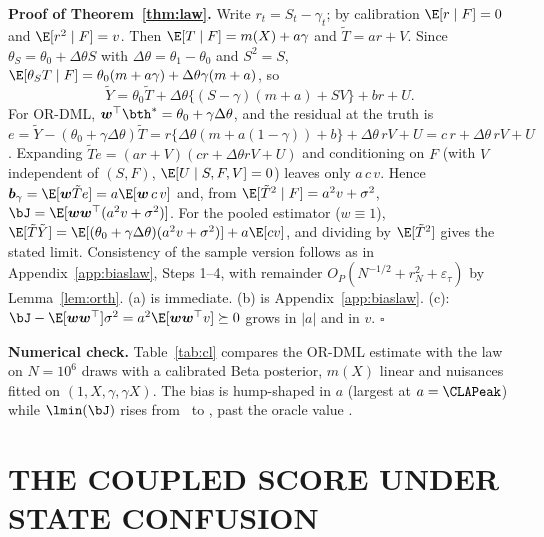 \textbf{Proof of Theorem~\ref{thm:law}.} Write $r_t=S_t-\gamma_t$; by calibration $\E[r\mid F]=0$ and $\E[r^2\mid F]=v$. Then $\E[T\mid F]=m(X)+a\gamma$ and $\tilde T=ar+V$. Since $\theta_S=\theta_0+\Delta\theta S$ with $\Delta\theta=\theta_1-\theta_0$ and $S^2=S$, $\E[\theta_ST\mid F]=\theta_0(m+a\gamma)+\Delta\theta\gamma(m+a)$, so
\[
\tilde Y=\theta_0\tilde T+\Delta\theta\{(S-\gamma)(m+a)+SV\}+br+U .
\]
For OR-DML, $\boldsymbol w^\top\bth^*=\theta_0+\gamma\Delta\theta$, and the residual at the truth is
$e=\tilde Y-(\theta_0+\gamma\Delta\theta)\tilde T=r\{\Delta\theta(m+a(1-\gamma))+b\}+\Delta\theta\,rV+U=c\,r+\Delta\theta\,rV+U$.
Expanding $\tilde Te=(ar+V)(cr+\Delta\theta rV+U)$ and conditioning on $F$ (with $V$ independent of $(S,F)$, $\E[U\mid S,F,V]=0$) leaves only $a\,c\,v$. Hence $\boldsymbol b_\gamma=\E[\boldsymbol w\tilde Te]=a\E[\boldsymbol w\,c\,v]$ and, from $\E[\tilde T^2\mid F]=a^2v+\sigma^2$, $\bJ=\E[\boldsymbol w\boldsymbol w^\top(a^2v+\sigma^2)]$. For the pooled estimator ($w\equiv1$), $\E[\tilde T\tilde Y]=\E[(\theta_0+\gamma\Delta\theta)(a^2v+\sigma^2)]+a\E[cv]$, and dividing by $\E[\tilde T^2]$ gives the stated limit. Consistency of the sample version follows as in Appendix~\ref{app:biaslaw}, Steps 1--4, with remainder $O_P(N^{-1/2}+r_N^2+\varepsilon_\tau)$ by Lemma~\ref{lem:orth}. (a) is immediate. (b) is Appendix~\ref{app:biaslaw}. (c): $\bJ-\E[\boldsymbol w\boldsymbol w^\top]\sigma^2=a^2\E[\boldsymbol w\boldsymbol w^\top v]\succeq0$ grows in $|a|$ and in $v$. $\square$

\textbf{Numerical check.} Table~\ref{tab:cl} compares the OR-DML estimate with the law on $N=10^6$ draws with a calibrated Beta posterior, $m(X)$ linear and nuisances fitted on $(1,X,\gamma,\gamma X)$. The bias is hump-shaped in $a$ (largest at $a=\CLAPeak$) while $\lmin(\bJ)$ rises from \CLLamLo\ to \CLLamHi, past the oracle value \CLLamOracle.
\begin{table}[h]\centering\footnotesize
\caption{Residual-state law for posterior-adjusted OR-DML: estimate versus law, true $\bth^*=(0.5,0.5+\Delta\theta)$ (\texttt{reports/synthesis/coupled\_law\_check.csv}).}\label{tab:cl}

\end{table}

\section{THE COUPLED SCORE UNDER STATE CONFUSION}
\label{app:exact}

